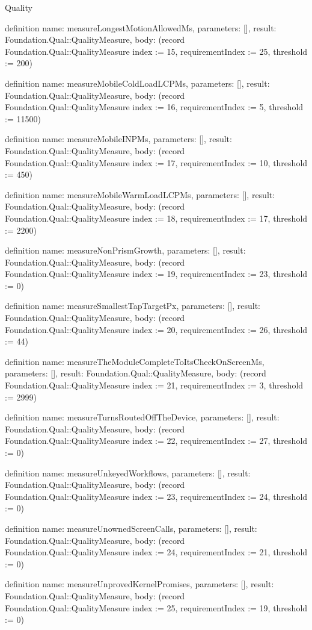 \begin{lexlean}{Quality}
\begin{semanticmodule}
definition{
  name: measureLongestMotionAllowedMs,
  parameters: [],
  result: Foundation.Qual::QualityMeasure,
  body: (record Foundation.Qual::QualityMeasure {index := 15, requirementIndex := 25, threshold := 200})
}

definition{
  name: measureMobileColdLoadLCPMs,
  parameters: [],
  result: Foundation.Qual::QualityMeasure,
  body: (record Foundation.Qual::QualityMeasure {index := 16, requirementIndex := 5, threshold := 11500})
}

definition{
  name: measureMobileINPMs,
  parameters: [],
  result: Foundation.Qual::QualityMeasure,
  body: (record Foundation.Qual::QualityMeasure {index := 17, requirementIndex := 10, threshold := 450})
}

definition{
  name: measureMobileWarmLoadLCPMs,
  parameters: [],
  result: Foundation.Qual::QualityMeasure,
  body: (record Foundation.Qual::QualityMeasure {index := 18, requirementIndex := 17, threshold := 2200})
}

definition{
  name: measureNonPrismGrowth,
  parameters: [],
  result: Foundation.Qual::QualityMeasure,
  body: (record Foundation.Qual::QualityMeasure {index := 19, requirementIndex := 23, threshold := 0})
}

definition{
  name: measureSmallestTapTargetPx,
  parameters: [],
  result: Foundation.Qual::QualityMeasure,
  body: (record Foundation.Qual::QualityMeasure {index := 20, requirementIndex := 26, threshold := 44})
}

definition{
  name: measureTheModuleCompleteToItsCheckOnScreenMs,
  parameters: [],
  result: Foundation.Qual::QualityMeasure,
  body: (record Foundation.Qual::QualityMeasure {index := 21, requirementIndex := 3, threshold := 2999})
}

definition{
  name: measureTurnsRoutedOffTheDevice,
  parameters: [],
  result: Foundation.Qual::QualityMeasure,
  body: (record Foundation.Qual::QualityMeasure {index := 22, requirementIndex := 27, threshold := 0})
}

definition{
  name: measureUnkeyedWorkflows,
  parameters: [],
  result: Foundation.Qual::QualityMeasure,
  body: (record Foundation.Qual::QualityMeasure {index := 23, requirementIndex := 24, threshold := 0})
}

definition{
  name: measureUnownedScreenCalls,
  parameters: [],
  result: Foundation.Qual::QualityMeasure,
  body: (record Foundation.Qual::QualityMeasure {index := 24, requirementIndex := 21, threshold := 0})
}

definition{
  name: measureUnprovedKernelPromises,
  parameters: [],
  result: Foundation.Qual::QualityMeasure,
  body: (record Foundation.Qual::QualityMeasure {index := 25, requirementIndex := 19, threshold := 0})
}


\end{semanticmodule}
\end{lexlean}
